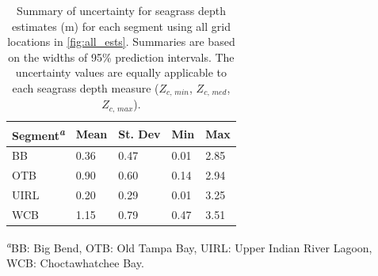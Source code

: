 \documentclass[letterpaper,12pt,oneside]{article}\usepackage[]{graphicx}\usepackage[]{color}
\begin{document}
\begin{table}[!tbp]
\caption{Summary of uncertainty for seagrass depth estimates (m) for each segment using all grid locations in \cref{fig:all_ests}.  Summaries are based on the widths of 95\% prediction intervals.  The uncertainty values are equally applicable to each seagrass depth measure ($Z_{c,\,min}$, $Z_{c,\,med}$, $Z_{c,\,max}$).\label{tab:sens_summ}} 
\begin{center}
\begin{tabular}{lllll}
\hline\hline
\multicolumn{1}{l}{Segment\textsuperscript{\textit{a}}}&\multicolumn{1}{c}{Mean}&\multicolumn{1}{c}{St. Dev}&\multicolumn{1}{c}{Min}&\multicolumn{1}{c}{Max}\tabularnewline
\hline
BB&0.36&0.47&0.01&2.85\tabularnewline
OTB&0.90&0.60&0.14&2.94\tabularnewline
UIRL&0.20&0.29&0.01&3.25\tabularnewline
WCB&1.15&0.79&0.47&3.51\tabularnewline
\hline
\end{tabular}\end{center}

\textsuperscript{\textit{a}}\footnotesize BB: Big Bend, OTB: Old Tampa Bay, UIRL: Upper Indian River Lagoon, WCB: Choctawhatchee Bay.\end{table}
\end{document}
